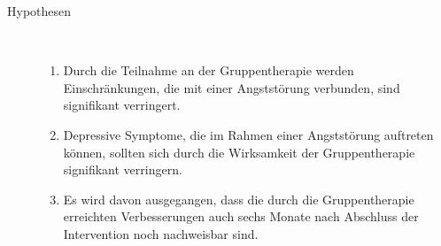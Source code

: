 \begin{description}
  \item[Hypothesen]~\par
  \begin{enumerate}
      \item Durch die Teilnahme an der Gruppentherapie werden Einschränkungen, die mit einer Angststörung verbunden, sind signifikant verringert.
      \item Depressive Symptome, die im Rahmen einer Angststörung auftreten können, sollten sich durch die Wirksamkeit der Gruppentherapie signifikant verringern.
      \item Es wird davon ausgegangen, dass die durch die Gruppentherapie erreichten Verbesserungen auch sechs Monate nach Abschluss der Intervention noch nachweisbar sind.
  \end{enumerate}
\end{description}  